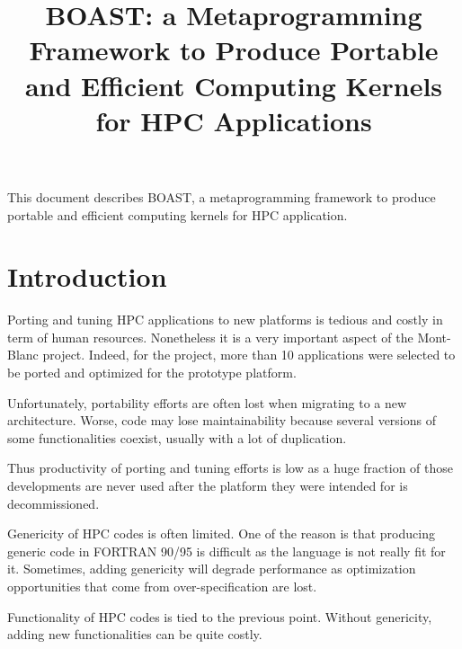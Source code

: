 \documentclass[11pt, a4paper, twoside]{montblanc}
\begin{document}
\title{BOAST: a Metaprogramming Framework to Produce Portable and Efficient Computing Kernels for HPC Applications}

\maketitle

\begin{changelog}
\end{changelog}

\frontmatter

\begin{executive}
This document describes BOAST, a metaprogramming framework to produce portable and efficient computing kernels for HPC application.
\end{executive}

\section{Introduction}

Porting and tuning HPC applications to new platforms is tedious and costly in
term of human resources. Nonetheless it is a very important aspect of the
Mont-Blanc project. Indeed, for the project, more than 10 applications were
selected to be ported and optimized for the prototype platform.

Unfortunately, portability efforts are often lost when migrating to a new
architecture. Worse, code may lose maintainability because several versions of
some functionalities coexist, usually with a lot of duplication.

Thus productivity of porting and tuning efforts is low as a huge fraction of
those developments are never used after the platform they were intended for is
decommissioned.

Genericity of HPC codes is often limited. One of the reason is that producing
generic code in FORTRAN 90/95 is difficult as the language is not really fit
for it. Sometimes, adding genericity will degrade performance as optimization
opportunities that come from over-specification are lost.

Functionality of HPC codes is tied to the previous point. Without genericity,
adding new functionalities can be quite costly.
\end{document}
